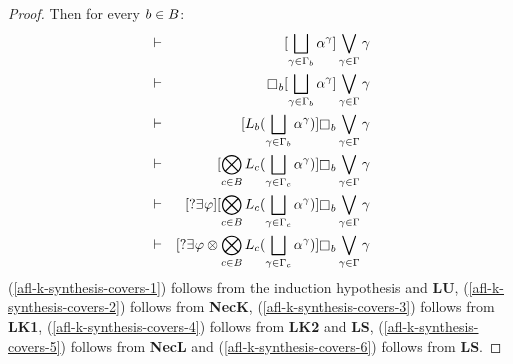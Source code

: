 \begin{proof}
Then for every $b \in B$: 
\begin{eqnarray}
    &\proves& \actionA{\bigchoice_{\gamma \in \Gamma_\agentB} \alpha^\gamma} \bigvee_{\gamma \in \Gamma} \gamma\label{afl-k-synthesis-covers-1}\\
    &\proves& \necessary_\agentB \actionA{\bigchoice_{\gamma \in \Gamma_\agentB} \alpha^\gamma} \bigvee_{\gamma \in \Gamma} \gamma\label{afl-k-synthesis-covers-2}\\
    &\proves& \actionA{\learnsB (\bigchoice_{\gamma \in \Gamma_\agentB} \alpha^\gamma)} \necessary_\agentB \bigvee_{\gamma \in \Gamma} \gamma\label{afl-k-synthesis-covers-3}\\
    &\proves& \actionA{\bigcompose_{\agentC \in \agentsB} \learnsC (\bigchoice_{\gamma \in \Gamma_\agentC} \alpha^\gamma)} \necessary_\agentB \bigvee_{\gamma \in \Gamma} \gamma\label{afl-k-synthesis-covers-4}\\
    &\proves& \actionA{\test{\somerefs \phi}} \actionA{\bigcompose_{\agentC \in \agentsB} \learnsC (\bigchoice_{\gamma \in \Gamma_\agentC} \alpha^\gamma)} \necessary_\agentB \bigvee_{\gamma \in \Gamma} \gamma\label{afl-k-synthesis-covers-5}\\
    &\proves& \actionA{\test{\somerefs \phi} \compose \bigcompose_{\agentC \in \agentsB} \learnsC (\bigchoice_{\gamma \in \Gamma_\agentC} \alpha^\gamma)} \necessary_\agentB \bigvee_{\gamma \in \Gamma} \gamma\label{afl-k-synthesis-covers-6}
\end{eqnarray}
(\ref{afl-k-synthesis-covers-1}) follows from the induction hypothesis and {\bf LU},
(\ref{afl-k-synthesis-covers-2}) follows from {\bf NecK},
(\ref{afl-k-synthesis-covers-3}) follows from {\bf LK1},
(\ref{afl-k-synthesis-covers-4}) follows from {\bf LK2} and {\bf LS},
(\ref{afl-k-synthesis-covers-5}) follows from {\bf NecL} and
(\ref{afl-k-synthesis-covers-6}) follows from {\bf LS}.


\end{proof}
